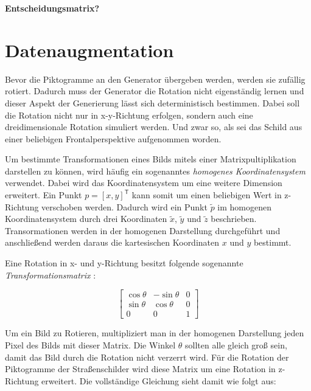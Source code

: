 \textbf{Entscheidungsmatrix?}

\section{Datenaugmentation}
Bevor die Piktogramme an den Generator übergeben werden, werden sie zufällig rotiert. Dadurch muss der Generator die Rotation nicht eigenständig lernen und dieser Aspekt der Generierung lässt sich deterministisch bestimmen. Dabei soll die Rotation nicht nur in x-y-Richtung erfolgen, sondern auch eine dreidimensionale Rotation simuliert werden. Und zwar so, als sei das Schild aus einer beliebigen Frontalperspektive aufgenommen worden.

Um bestimmte Transformationen eines Bilds mitels einer Matrixpultiplikation darstellen zu können, wird häufig ein sogenanntes \emph{homogenes Koordinatensystem} verwendet. Dabei wird das Koordinatensystem um eine weitere Dimension erweitert. Ein Punkt $p = [x, y]^\mathsf{T}$ kann somit um einen beliebigen Wert in z-Richtung verschoben werden. Dadurch wird ein Punkt $\tilde{p}$ im homogenen Koordinatensystem durch drei Koordinaten $\tilde{x}$, $\tilde{y}$ und $\tilde{z}$ beschrieben. Transormationen werden in der homogenen Darstellung durchgeführt und anschließend werden daraus die kartesischen Koordinaten $x$ und $y$ bestimmt. \cite{geometric-ops}

Eine Rotation in x- und y-Richtung besitzt folgende sogenannte \emph{Transformationsmatrix} \cite{geometric-ops}:

\begin{equation}
    \begin{bmatrix}
        \cos{\theta} & -\sin{\theta} & 0\\
        \sin{\theta} & \cos{\theta} & 0\\
        0 & 0 & 1
    \end{bmatrix}
\end{equation}

Um ein Bild zu Rotieren, multipliziert man in der homogenen Darstellung jeden Pixel des Bilds mit dieser Matrix. Die Winkel $\theta$ sollten alle gleich groß sein, damit das Bild durch die Rotation nicht verzerrt wird. Für die Rotation der Piktogramme der Straßenschilder wird diese Matrix um eine Rotation in z-Richtung erweitert. Die vollständige Gleichung sieht damit wie folgt aus:

